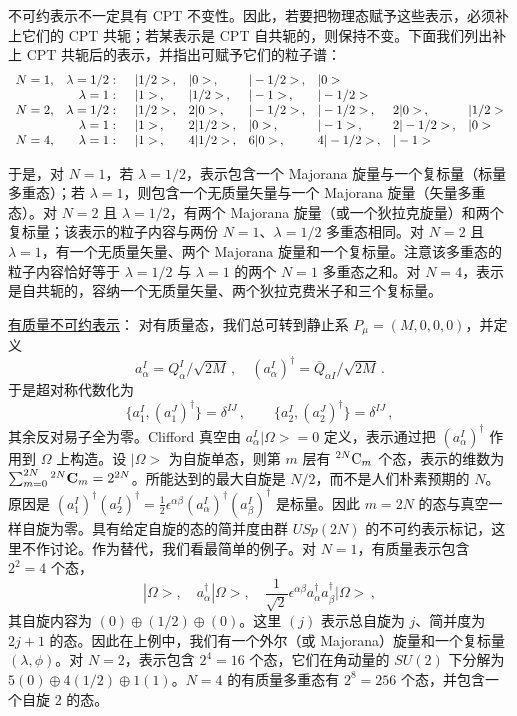 不可约表示不一定具有 CPT 不变性。因此，若要把物理态赋予这些表示，必须补上它们的 CPT 共轭；若某表示是 CPT 自共轭的，则保持不变。下面我们列出补上 CPT 共轭后的表示，并指出可赋予它们的粒子谱：
$$
\begin{array}{lrllllll}
N=1,&\lambda=1/2:&\,\,\, |1/2>\,,&|0>\,,   &|-1/2>\,,&|0>\hphantom{,}&& \\
    &\lambda=1:&\,\,\,|1> \,,&|1/2>\,, &|-1>\,,  &|-1/2>\hphantom{,}&& \\
N=2,&\lambda=1/2:&\,\,\,|1/2>\,,&2|0>\,,&|-1/2>\,,&|-1/2>\,,&2|0>\,,&|1/2>\\
    &\lambda=1:&\,\,\, |1> \,,&2|1/2>\,,&|0>\,,   &|-1>\,, &2|-1/2>\,,&|0>\\
N=4,&\lambda=1:&\,\,\, |1>\,,&4|1/2>\,,&6|0>\,,&4|-1/2>\,,&|-1>\hphantom{,}&
\end{array}
$$


于是，对 $N=1$，若 $\lambda=1/2$，表示包含一个 Majorana 旋量与一个复标量（标量多重态）；若 $\lambda=1$，则包含一个无质量矢量与一个 Majorana 旋量（矢量多重态）。对 $N=2$ 且 $\lambda=1/2$，有两个 Majorana 旋量（或一个狄拉克旋量）和两个复标量；该表示的粒子内容与两份 $N=1$、$\lambda=1/2$ 多重态相同。对 $N=2$ 且 $\lambda=1$，有一个无质量矢量、两个 Majorana 旋量和一个复标量。注意该多重态的粒子内容恰好等于 $\lambda=1/2$ 与 $\lambda=1$ 的两个 $N=1$ 多重态之和。对 $N=4$，表示是自共轭的，容纳一个无质量矢量、两个狄拉克费米子和三个复标量。

\noindent\underline{有质量不可约表示}：
\noindent 对有质量态，我们总可转到静止系 $P_\mu=(M,0,0,0)$，并定义
$$
a^I_\alpha=Q^I_\alpha/\sqrt{2M}\,,\quad (a^I_\alpha)^\dagger= 
{\bar Q}_{\dot\alpha I}/\sqrt{2M}\,.
$$
于是超对称代数化为
$$
\{a^I_1,(a_1^J)^\dagger\}=\delta^{IJ}\,,\qquad 
\{a^I_2,(a_2^J)^\dagger\}=\delta^{IJ}\,,
$$
其余反对易子全为零。Clifford 真空由 $a^I_\alpha |\Omega>=0$ 定义，表示通过把 $(a^I_\alpha)^\dagger$ 作用到 $\Omega$ 上构造。设
$|\Omega>$ 为自旋单态，则第 $m$ 层有 $^{2N}{\rm C}_m$ 个态，表示的维数为
$\sum_{m=0}^{2N}{}^{2N}{\rm\bf C}_m=2^{2N}$。所能达到的最大自旋是 $N/2$，而不是人们朴素预期的 $N$。原因是
$(a^I_1)^\dagger(a^I_2)^\dagger=\frac{1}{2}
\epsilon^{\alpha\beta} (a^I_\alpha)^\dagger(a^I_\beta)^\dagger$ 是标量。因此 $m=2N$ 的态与真空一样自旋为零。具有给定自旋的态的简并度由群 $USp(2N)$ 的不可约表示标记，这里不作讨论。作为替代，我们看最简单的例子。对 $N=1$，有质量表示包含 $2^2=4$ 个态，
$$
|\Omega>,\quad a^\dagger_\alpha |\Omega>,\quad\frac{1}{\sqrt{2}}
\epsilon^{\alpha \beta} a^\dagger_\alpha a^\dagger_\beta |\Omega>\,,
$$
其自旋内容为 $(0)\oplus (1/2)\oplus (0)$。这里 $(j)$ 表示总自旋为 $j$、简并度为 $2j+1$ 的态。因此在上例中，我们有一个外尔（或 Majorana）旋量和一个复标量
$(\lambda , \phi)$。对 $N=2$，表示包含 $2^4=16$ 个态，它们在角动量的 $SU(2)$ 下分解为
$5(0)\oplus 4(1/2)\oplus 1(1)$。$N=4$ 的有质量多重态有
$2^8=256$ 个态，并包含一个自旋 $2$ 的态。

